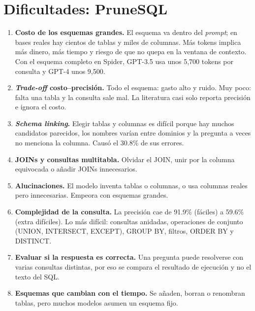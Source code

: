 \documentclass[11pt,a4paper]{article}
\begin{document}
\section{Dificultades: PruneSQL}
\begin{enumerate}
  \item \textbf{Costo de los esquemas grandes.} El esquema va dentro del \textit{prompt}; en bases reales hay cientos de tablas y miles de columnas. Más tokens implica más dinero, más tiempo y riesgo de que no quepa en la ventana de contexto. Con el esquema completo en Spider, GPT-3.5 usa unos 5{,}700 tokens por consulta y GPT-4 unos 9{,}500.
  \item \textbf{\textit{Trade-off} costo--precisión.} Todo el esquema: gasto alto y ruido. Muy poco: falta una tabla y la consulta sale mal. La literatura casi solo reporta precisión e ignora el costo.
  \item \textbf{\textit{Schema linking}.} Elegir tablas y columnas es difícil porque hay muchos candidatos parecidos, los nombres varían entre dominios y la pregunta a veces no menciona la columna. Causó el 30.8\% de sus errores.
  \item \textbf{JOINs y consultas multitabla.} Olvidar el JOIN, unir por la columna equivocada o añadir JOINs innecesarios.
  \item \textbf{Alucinaciones.} El modelo inventa tablas o columnas, o usa columnas reales pero innecesarias. Empeora con esquemas grandes.
  \item \textbf{Complejidad de la consulta.} La precisión cae de 91.9\% (fáciles) a 59.6\% (extra difíciles). Lo más difícil: consultas anidadas, operaciones de conjunto (UNION, INTERSECT, EXCEPT), GROUP BY, filtros, ORDER BY y DISTINCT.
  \item \textbf{Evaluar si la respuesta es correcta.} Una pregunta puede resolverse con varias consultas distintas, por eso se compara el resultado de ejecución y no el texto del SQL.
  \item \textbf{Esquemas que cambian con el tiempo.} Se añaden, borran o renombran tablas, pero muchos modelos asumen un esquema fijo.
\end{enumerate}

\end{document}
